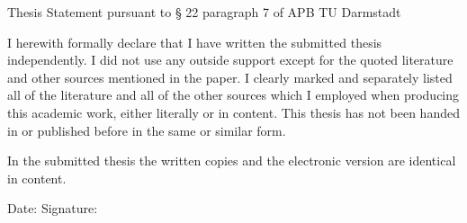 \thispagestyle{empty}
\vspace*{9 cm}

\noindent
Thesis Statement pursuant to § 22 paragraph 7 of APB TU Darmstadt

\vspace*{1.5 cm}
\noindent
I herewith formally declare that I have written the submitted thesis independently. I did not
use any outside support except for the quoted literature and other sources mentioned in the
paper. I clearly marked and separately listed all of the literature and all of the other sources
which I employed when producing this academic work, either literally or in content. This
thesis has not been handed in or published before in the same or similar form.

\noindent
In the submitted thesis the written copies and the electronic version are identical in content.

\vspace{2 cm}

Date: \hspace{5 cm} Signature:
\clearpage
